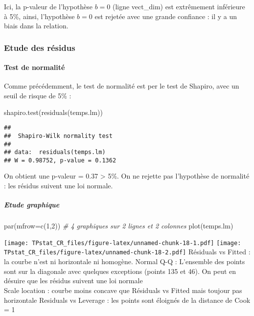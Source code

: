 \documentclass[
]{article}
\newenvironment{Shaded}{\begin{snugshade}}{\end{snugshade}}
\newcommand{\AttributeTok}[1]{\textcolor[rgb]{0.77,0.63,0.00}{#1}}
\newcommand{\CommentTok}[1]{\textcolor[rgb]{0.56,0.35,0.01}{\textit{#1}}}
\newcommand{\DecValTok}[1]{\textcolor[rgb]{0.00,0.00,0.81}{#1}}
\newcommand{\FunctionTok}[1]{\textcolor[rgb]{0.00,0.00,0.00}{#1}}
\newcommand{\NormalTok}[1]{#1}
\begin{document}
Ici, la p-valeur de l'hypothèse \(b=0\) (ligne vect\_dim) est
extrêmement inférieure à 5\%, ainsi, l'hypothèse \(b=0\) est rejetée
avec une grande confiance : il y a un biais dans la relation.

\hypertarget{etude-des-ruxe9sidus}{%
\subsubsection{Etude des résidus}\label{etude-des-ruxe9sidus}}

\hypertarget{test-de-normalituxe9-1}{%
\paragraph{Test de normalité}\label{test-de-normalituxe9-1}}

Comme précédemment, le test de normalité est per le test de Shapiro,
avec un seuil de risque de 5\% :

\begin{Shaded}
\begin{Highlighting}[]
\FunctionTok{shapiro.test}\NormalTok{(}\FunctionTok{residuals}\NormalTok{(temps.lm))}
\end{Highlighting}
\end{Shaded}

\begin{verbatim}
## 
##  Shapiro-Wilk normality test
## 
## data:  residuals(temps.lm)
## W = 0.98752, p-value = 0.1362
\end{verbatim}

On obtient une p-valeur = 0.37 \textgreater{} 5\%. On ne rejette pas
l'hypothèse de normalité : les résidus suivent une loi normale.

\hypertarget{etude-graphique}{%
\subparagraph{Etude graphique}\label{etude-graphique}}

\begin{Shaded}
\begin{Highlighting}[]
\FunctionTok{par}\NormalTok{(}\AttributeTok{mfrow=}\FunctionTok{c}\NormalTok{(}\DecValTok{1}\NormalTok{,}\DecValTok{2}\NormalTok{)) }\CommentTok{\# 4 graphiques sur 2 lignes et 2 colonnes}
\FunctionTok{plot}\NormalTok{(temps.lm)}
\end{Highlighting}
\end{Shaded}

\texttt{[image: TPstat\_CR\_files/figure-latex/unnamed-chunk-18-1.pdf]}
\texttt{[image: TPstat\_CR\_files/figure-latex/unnamed-chunk-18-2.pdf]}
Résiduals vs Fitted : la courbe n'est ni horizontale ni homogène. Normal
Q-Q : L'ensemble des points sont sur la diagonale avec quelques
exceptions (points 135 et 46). On peut en désuire que les résidus
suivent une loi normale\\
Scale location : courbe moins concave que Résiduals vs Fitted mais
toujour pas horizontale Residuals vs Leverage : les points sont éloignés
de la distance de Cook = 1
\end{document}
